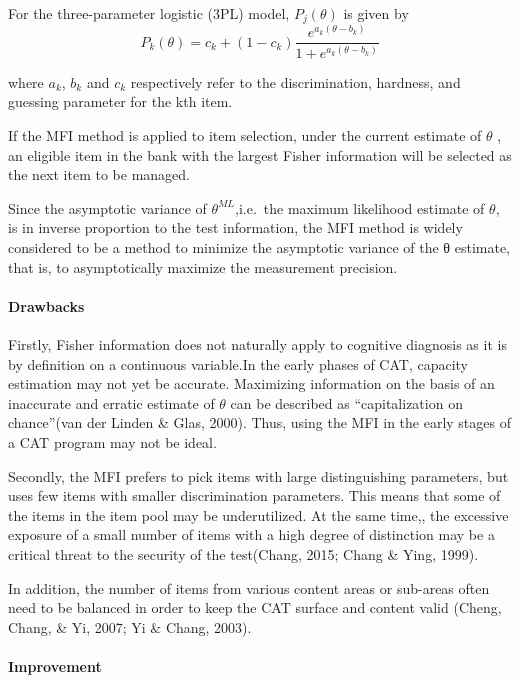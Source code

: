 \documentclass[
]{article}
\begin{document}
For the three-parameter logistic (3PL) model, \(P_j(θ)\) is given by
\[P_k(\theta)=c_k+(1-c_k)\frac{e^{a_k(\theta-b_k)}}{1+e^{a_k(\theta-b_k)}}\]

where \(a_k\), \(b_k\) and \(c_k\) respectively refer to the
discrimination, hardness, and guessing parameter for the kth item.

If the MFI method is applied to item selection, under the current
estimate of \(\theta\) , an eligible item in the bank with the largest
Fisher information will be selected as the next item to be managed.

Since the asymptotic variance of \(\theta ^{ML}\),i.e.~the maximum
likelihood estimate of \(\theta\), is in inverse proportion to the test
information, the MFI method is widely considered to be a method to
minimize the asymptotic variance of the θ estimate, that is, to
asymptotically maximize the measurement precision.

\hypertarget{drawbacks}{%
\paragraph{Drawbacks}\label{drawbacks}}

Firstly, Fisher information does not naturally apply to cognitive
diagnosis as it is by definition on a continuous variable.In the early
phases of CAT, capacity estimation may not yet be accurate. Maximizing
information on the basis of an inaccurate and erratic estimate of
\(\theta\) can be described as ``capitalization on chance''(van der
Linden \& Glas, 2000). Thus, using the MFI in the early stages of a CAT
program may not be ideal.

Secondly, the MFI prefers to pick items with large distinguishing
parameters, but uses few items with smaller discrimination parameters.
This means that some of the items in the item pool may be underutilized.
At the same time,, the excessive exposure of a small number of items
with a high degree of distinction may be a critical threat to the
security of the test(Chang, 2015; Chang \& Ying, 1999).

In addition, the number of items from various content areas or sub-areas
often need to be balanced in order to keep the CAT surface and content
valid (Cheng, Chang, \& Yi, 2007; Yi \& Chang, 2003).

\hypertarget{improvement}{%
\paragraph{Improvement}\label{improvement}}
\end{document}
